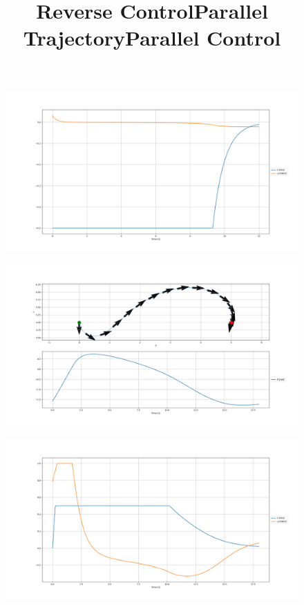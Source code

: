 \documentclass[12pt]{article}
\begin{document}
\begin{enumerate}
	\begin{figure}[H]
		\centering
		\title{\bf Reverse Control}
		\includegraphics[width=\textwidth]{../Figures/hw1_3_ii_b_reverse.png}
	\end{figure}
	\begin{figure}[H]
		\centering
		\title{\bf Parallel Trajectory}
		\includegraphics[width=\textwidth]{../Figures/hw1_3_ii_a_parallel.png}
	\end{figure}
	\begin{figure}[H]
		\centering
		\title{\bf Parallel Control}
		\includegraphics[width=\textwidth]{../Figures/hw1_3_ii_b_parallel.png}
	\end{figure}
\end{enumerate}
\end{document}
